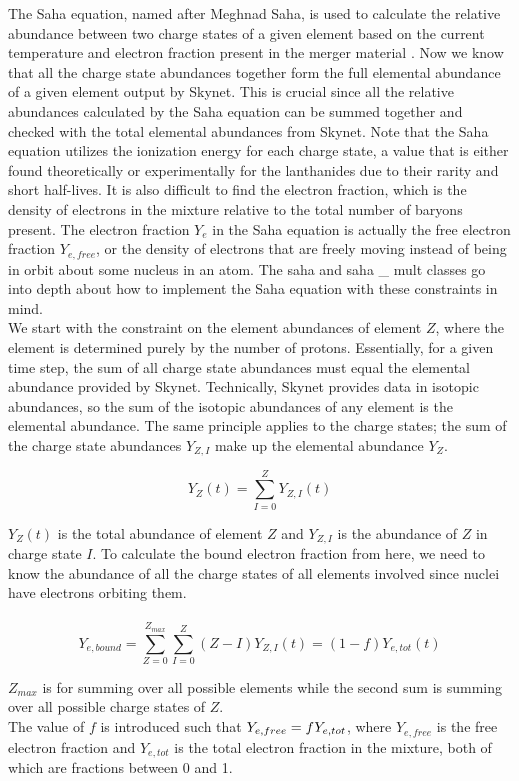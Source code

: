\documentclass[11pt,a4paper]{article}
\begin{document}
The Saha equation, named after Meghnad Saha, is used to calculate the relative abundance between two charge states of a given element based on the current temperature and electron fraction present in the merger material \cite{Fridman_2012} . Now we know that all the charge state abundances together form the full elemental abundance of a given element output by Skynet. This is crucial since all the relative abundances calculated by the Saha equation can be summed together and checked with the total elemental abundances from Skynet. Note that the Saha equation utilizes the ionization energy for each charge state, a value that is either found theoretically or experimentally for the lanthanides due to their rarity and short half-lives. It is also difficult to find the electron fraction, which is the density of electrons in the mixture relative to the total number of baryons present. The electron fraction $Y_e$ in the Saha equation is actually the free electron fraction $Y_{e,free}$, or the density of electrons that are freely moving instead of being in orbit about some nucleus in an atom. The saha and saha \_ mult classes go into depth about how to implement the Saha equation with these constraints in mind.  \\



We start with the constraint on the element abundances of element $Z$, where the element is determined purely by the number of protons. Essentially, for a given time step, the sum of all charge state abundances must equal the elemental abundance provided by Skynet. Technically, Skynet provides data in isotopic abundances, so the sum of the isotopic abundances of any element is the elemental abundance. The same principle applies to the charge states; the sum of the charge state abundances $Y_{Z,I}$ make up the elemental abundance $Y_Z$.

$$Y_Z (t) = \sum_{I=0}^{Z} Y_{Z,I}(t)$$

$Y_Z (t)$ is the total abundance of element $Z$ and $Y_{Z,I}$ is the abundance of $Z$ in charge state $I$. To calculate the bound electron fraction from here, we need to know the abundance of all the charge states of all elements involved since nuclei have electrons orbiting them. 
\\\\
$$Y_{e,bound} = \sum_{Z=0}^{Z_{max}} \sum_{I=0}^{Z} (Z - I) Y_{Z,I}(t) = (1-f) Y_{e,tot}(t) $$

$Z_{max}$ is for summing over all possible elements while the second sum is summing over all possible charge states of $Z$. 
\\The value of $f$ is introduced such that $Y_{e,free} = f \hspace{.1mm} Y_{e,tot}$, where $Y_{e,free}$ is the free electron fraction and $Y_{e,tot}$ is the total electron fraction in the mixture, both of which are fractions between 0 and 1. \\
\end{document}
